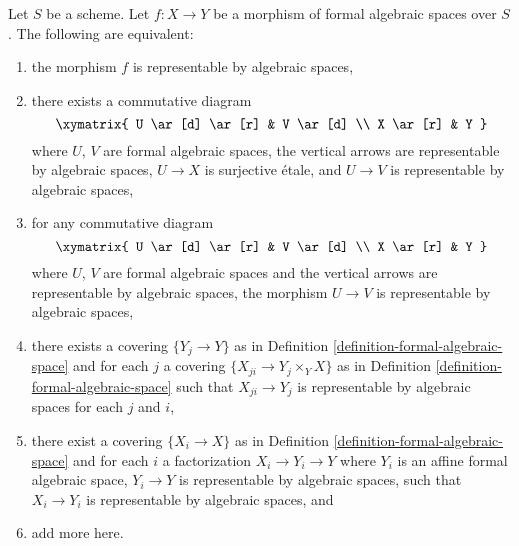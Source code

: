 \begin{lemma}
\label{lemma-representable-by-algebraic-spaces-local}
Let $S$ be a scheme. Let $f : X \to Y$ be a morphism of formal algebraic
spaces over $S$. The following are equivalent:
\begin{enumerate}
\item the morphism $f$ is representable by algebraic spaces,
\item there exists a commutative diagram
$$
\xymatrix{
U \ar[d] \ar[r] & V \ar[d] \\
X \ar[r] & Y
}
$$
where $U$, $V$ are formal algebraic spaces, the vertical arrows are
representable by algebraic spaces, $U \to X$
is surjective \'etale, and $U \to V$ is representable by algebraic spaces,
\item for any commutative diagram
$$
\xymatrix{
U \ar[d] \ar[r] & V \ar[d] \\
X \ar[r] & Y
}
$$
where $U$, $V$ are formal algebraic spaces and the vertical arrows are
representable by algebraic spaces, the morphism $U \to V$ is
representable by algebraic spaces,
\item there exists a covering $\{Y_j \to Y\}$ as in
Definition \ref{definition-formal-algebraic-space}
and for each $j$ a covering $\{X_{ji} \to Y_j \times_Y X\}$ as in
Definition \ref{definition-formal-algebraic-space} such that
$X_{ji} \to Y_j$ is representable by algebraic spaces for each $j$ and $i$,
\item there exist a covering $\{X_i \to X\}$ as in
Definition \ref{definition-formal-algebraic-space}
and for each $i$ a factorization $X_i \to Y_i \to Y$ where $Y_i$
is an affine formal algebraic space, $Y_i \to Y$ is representable
by algebraic spaces, such that $X_i \to Y_i$ is representable by algebraic
spaces, and
\item add more here.
\end{enumerate}
\end{lemma}

